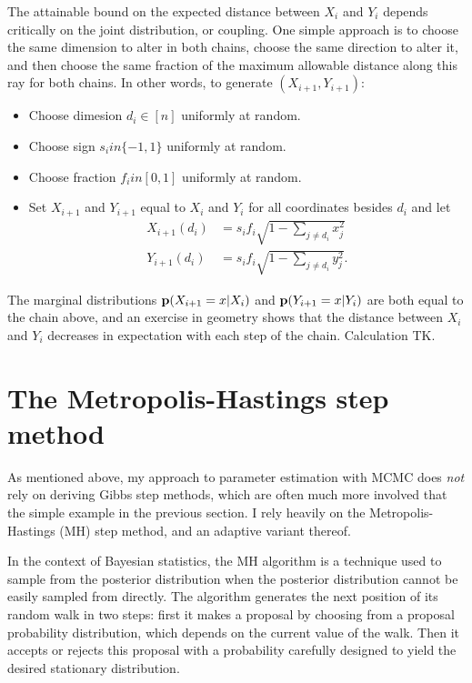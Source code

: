 The attainable bound on the expected distance between $X_i$ and $Y_i$
depends critically on the joint distribution, or coupling.  One simple
approach is to choose the same dimension to alter in both chains,
choose the same direction to alter it, and then choose the same
fraction of the maximum allowable distance along this ray for both
chains.  In other words, to generate $(X_{i+1}, Y_{i+1})$:
\begin{itemize}
\item Choose dimesion $d_i \in [n]$ uniformly at random.
\item Choose sign $s_i in \{-1, 1\}$ uniformly at random.
\item Choose fraction $f_i in [0,1]$ uniformly at random.
\item Set $X_{i+1}$ and $Y_{i+1}$ equal to $X_i$ and $Y_i$ for all coordinates besides $d_i$ and let
\begin{align*}
X_{i+1}(d_i) &= s_i f_i \sqrt{1 - \sum_{j\neq d_i} x_j^2}\\
Y_{i+1}(d_i) &= s_i f_i \sqrt{1 - \sum_{j\neq d_i} y_j^2}.
\end{align*}
\end{itemize}

The marginal distributions $\mathbf{p}(X_{i+1}=x|X_i)$ and
$\mathbf{p}(Y_{i+1}=x|Y_i)$ are both equal to the chain above, and an
exercise in geometry shows that the distance between $X_i$ and $Y_i$
decreases in expectation with each step of the chain. Calculation TK.

\section{The Metropolis-Hastings step method}
As mentioned above, my approach to parameter estimation with MCMC does
\emph{not} rely on deriving Gibbs step methods, which are often much
more involved that the simple example in the previous section.  I rely
heavily on the Metropolis-Hastings (MH) step method, and an adaptive
variant thereof.

In the context of Bayesian statistics, the MH
algorithm is a technique used to sample from the posterior
distribution when the posterior distribution cannot be easily sampled
from directly. The algorithm generates the next position of its random walk
in two steps: first it makes a proposal by choosing from a proposal
probability distribution, which depends on the current value of the
walk. Then it accepts or rejects this proposal with a probability
carefully designed to yield the desired stationary distribution.

